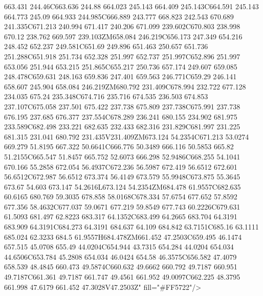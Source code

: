 663.431 244.46C663.636 244.88 664.023 245.143 664.409 245.143C664.591 245.143 664.773 245.09 664.933 244.985C666.889 243.777 668.823 242.543 670.689 241.335C671.213 240.994 671.417 240.206 671.099 239.602C670.803 238.998 670.12 238.762 669.597 239.103ZM658.084 246.219C656.173 247.349 654.216 248.452 652.237 249.581C651.69 249.896 651.463 250.657 651.736 251.288C651.918 251.734 652.328 251.997 652.737 251.997C652.896 251.997 653.056 251.944 653.215 251.865C655.217 250.736 657.174 249.607 659.085 248.478C659.631 248.163 659.836 247.401 659.563 246.771C659.29 246.141 658.607 245.904 658.084 246.219ZM680.792 231.409C678.994 232.722 677.128 234.035 675.24 235.348C674.716 235.716 674.535 236.503 674.853 237.107C675.058 237.501 675.422 237.738 675.809 237.738C675.991 237.738 676.195 237.685 676.377 237.554C678.289 236.241 680.155 234.902 681.975 233.589C682.498 233.221 682.635 232.433 682.316 231.829C681.997 231.225 681.315 231.041 680.792 231.435V231.409ZM673.124 54.2354C671.213 53.0274 669.279 51.8195 667.322 50.6641C666.776 50.3489 666.116 50.5853 665.82 51.2155C665.547 51.8457 665.752 52.6073 666.298 52.9486C668.255 54.1041 670.166 55.2858 672.054 56.4937C672.236 56.5987 672.419 56.6512 672.601 56.6512C672.987 56.6512 673.374 56.4149 673.579 55.9948C673.875 55.3645 673.67 54.603 673.147 54.2616L673.124 54.2354ZM684.478 61.9557C682.635 60.6165 680.769 59.3035 678.858 58.0168C678.334 57.6754 677.652 57.8592 677.356 58.4632C677.037 59.0671 677.219 59.8549 677.743 60.2226C679.631 61.5093 681.497 62.8223 683.317 64.1352C683.499 64.2665 683.704 64.3191 683.909 64.3191C684.273 64.3191 684.637 64.109 684.842 63.7151C685.16 63.1111 685.024 62.3233 684.5 61.9557H684.478ZM661.452 47.2503C659.495 46.1474 657.515 45.0708 655.49 44.0204C654.944 43.7315 654.284 44.0204 654.034 44.6506C653.784 45.2808 654.034 46.0424 654.58 46.3575C656.582 47.4079 658.539 48.4845 660.473 49.5874C660.632 49.6662 660.792 49.7187 660.951 49.7187C661.361 49.7187 661.747 49.4561 661.952 49.0097C662.225 48.3795 661.998 47.6179 661.452 47.3028V47.2503Z" fill="#FF5722"/>
